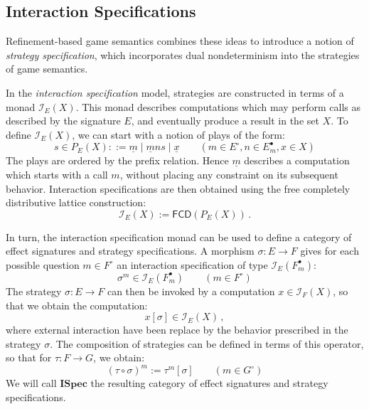 \documentclass[sigplan,10pt,review,anonymous]{acmart}
\newcommand{\kw}[1]{\ensuremath{ \mathsf{#1} }}
\newcommand{\que}{{\circ}}
\newcommand{\ans}{{\bullet}}
\newcommand{\ISpec}{\mathbf{ISpec}}
\begin{document}

\subsection{Interaction Specifications} %

Refinement-based game semantics \cite{rbgs-cal}
combines these ideas to introduce a notion of
\emph{strategy specification},
which incorporates dual nondeterminism
into the strategies of game semantics.

In the \emph{interaction specification} model,
strategies are constructed in terms of a monad $\mathcal{I}_E(X)$.
This monad describes computations
which may perform calls as described by the signature $E$,
and eventually produce a result in the set $X$.
To define $\mathcal{I}_E(X)$,
we can start with a notion of plays of the form:
\[
  s \in P_E(X) ::=
    \underline{m} \mid
    \underline{m}ns \mid
    \underline{x}
  \qquad
  (m \in E^\que, n \in E^\ans_m, x \in X)
\]
The plays are ordered by the prefix relation.
Hence $\underline{m}$ describes a computation
which starts with a call $m$,
without placing any constraint on its subsequent behavior.
Interaction specifications are then obtained
using the free completely distributive lattice construction:
\[
  \mathcal{I}_E(X) := \kw{FCD}(P_E(X)) \,.
\]

In turn,
the interaction specification monad can be used to define
a category of effect signatures and strategy specifications.
A morphism $\sigma : E \rightarrow F$
gives for each possible question $m \in F^\que$
an interaction specification of type $\mathcal{I}_E(F^\ans_m)$:
\[
  \sigma^m \in \mathcal{I}_E(F^\ans_m)
  \qquad
  (m \in F^\que)
\]
The strategy $\sigma : E \rightarrow F$
can then be invoked by a computation $x \in \mathcal{I}_F(X)$,
so that we obtain the computation:
\[
  x[\sigma] \in \mathcal{I}_E(X) \,,
\]
where external interaction have been
replace by the behavior prescribed in
the strategy $\sigma$.
The composition of strategies can be defined
in terms of this operator,
so that for $\tau : F \rightarrow G$,
we obtain:
\[
  (\tau \circ \sigma)^m := \tau^m[\sigma]
  \qquad
  (m \in G^\que)
\]
We will call $\ISpec$ the resulting category
of effect signatures and strategy specifications.

\end{document}
